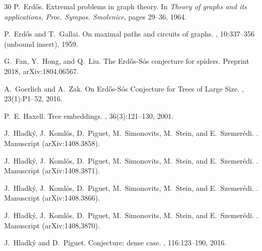 \documentclass[12pt]{article}
\begin{document}
\begin{thebibliography}{30}
P.~Erd\H{o}s.
\newblock Extremal problems in graph theory.
\newblock In {\em Theory of graphs and its applications, Proc. Sympos.
  Smolenice}, pages 29--36, 1964.


\iffalse
{}
P.~Erd{\H{o}}s and T.~Gallai.
\newblock On maximal paths and circuits of graphs.
, 10:337--356 (unbound insert),
  1959.

G.~Fan, Y.~Hong, and Q.~Liu.
\newblock The {E}rd{\H{o}}s-{S}\'os conjecture for spiders.
\newblock Preprint 2018, arXiv:1804.06567.

A.~Goerlich and A.~{Z}ak.
\newblock On {E}rd{\H{o}}s-{S}\'os {C}onjecture for {T}rees of {L}arge {S}ize.
, 23(1):P1--52, 2016.

P.~E. Haxell.
\newblock Tree embeddings.
, 36(3):121--130, 2001.

J.~Hladk{\'y}, J.~Koml{\'o}s, D.~Piguet, M.~Simonovits, M.~Stein, and
  E.~Szemer{\'e}di.
.
\newblock Manuscript (arXiv:1408.3858).

J.~Hladk{\'y}, J.~Koml{\'o}s, D.~Piguet, M.~Simonovits, M.~Stein, and
  E.~Szemer{\'e}di.
.
\newblock Manuscript (arXiv:1408.3871).

J.~Hladk{\'y}, J.~Koml{\'o}s, D.~Piguet, M.~Simonovits, M.~Stein, and
  E.~Szemer{\'e}di.
.
\newblock Manuscript (arXiv:1408.3866).

J.~Hladk{\'y}, J.~Koml{\'o}s, D.~Piguet, M.~Simonovits, M.~Stein, and
  E.~Szemer{\'e}di.
.
\newblock Manuscript (arXiv:1408.3870).


J.~Hladk{\'y} and D.~Piguet.
 {C}onjecture: dense case.
, 116:123--190, 2016.


\end{thebibliography}
\end{document}
